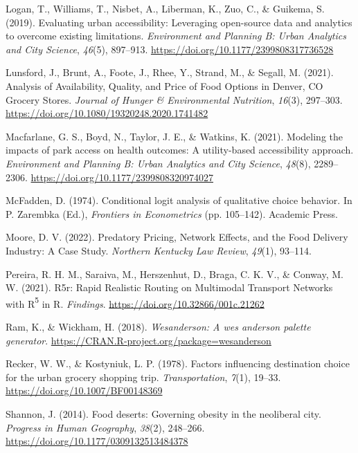 \documentclass[
  letterpaper,
  number,
  review,
  3p]{elsarticle}
\newlength{\cslhangindent}
\newenvironment{CSLReferences}[2] %
 {\begin{list}{}{%
  \setlength{\itemindent}{0pt}
  \setlength{\leftmargin}{0pt}
  \setlength{\parsep}{0pt}
  \ifodd #1
   \setlength{\leftmargin}{\cslhangindent}
   \setlength{\itemindent}{-1\cslhangindent}
  \fi
  \setlength{\itemsep}{#2\baselineskip}}}
 {\end{list}}
\begin{document}
\begin{CSLReferences}{1}{0}
Logan, T., Williams, T., Nisbet, A., Liberman, K., Zuo, C., \& Guikema,
S. (2019). Evaluating urban accessibility: Leveraging open-source data
and analytics to overcome existing limitations. \emph{Environment and
Planning B: Urban Analytics and City Science}, \emph{46}(5), 897--913.
\url{https://doi.org/10.1177/2399808317736528}

Lunsford, J., Brunt, A., Foote, J., Rhee, Y., Strand, M., \& Segall, M.
(2021). Analysis of {Availability}, {Quality}, and {Price} of {Food
Options} in {Denver}, {CO Grocery Stores}. \emph{Journal of Hunger \&
Environmental Nutrition}, \emph{16}(3), 297--303.
\url{https://doi.org/10.1080/19320248.2020.1741482}

Macfarlane, G. S., Boyd, N., Taylor, J. E., \& Watkins, K. (2021).
Modeling the impacts of park access on health outcomes: {A}
utility-based accessibility approach. \emph{Environment and Planning B:
Urban Analytics and City Science}, \emph{48}(8), 2289--2306.
\url{https://doi.org/10.1177/2399808320974027}

McFadden, D. (1974). Conditional logit analysis of qualitative choice
behavior. In P. Zarembka (Ed.), \emph{Frontiers in {Econometrics}} (pp.
105--142). Academic Press.

Moore, D. V. (2022). Predatory {Pricing}, {Network Effects}, and the
{Food Delivery Industry}: {A Case Study}. \emph{Northern Kentucky Law
Review}, \emph{49}(1), 93--114.

Pereira, R. H. M., Saraiva, M., Herszenhut, D., Braga, C. K. V., \&
Conway, M. W. (2021). R5r: {Rapid Realistic Routing} on {Multimodal
Transport Networks} with {R}{\textsuperscript{5}} in {R}.
\emph{Findings}. \url{https://doi.org/10.32866/001c.21262}

Ram, K., \& Wickham, H. (2018). \emph{Wesanderson: A wes anderson
palette generator}. \url{https://CRAN.R-project.org/package=wesanderson}

Recker, W. W., \& Kostyniuk, L. P. (1978). Factors influencing
destination choice for the urban grocery shopping trip.
\emph{Transportation}, \emph{7}(1), 19--33.
\url{https://doi.org/10.1007/BF00148369}

Shannon, J. (2014). Food deserts: {Governing} obesity in the neoliberal
city. \emph{Progress in Human Geography}, \emph{38}(2), 248--266.
\url{https://doi.org/10.1177/0309132513484378}


\end{CSLReferences}
\end{document}
